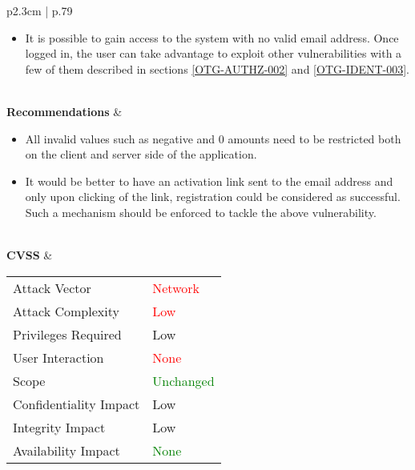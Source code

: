 \begin{longtable}[l]{ p{2.3cm} | p{.79\linewidth} }
\begin{itemize}
            \item It is possible to gain access to the system with no valid email address. Once logged in, the user can take advantage to exploit other vulnerabilities with a few of them described in sections \ref{OTG-AUTHZ-002} and \ref{OTG-IDENT-003}.
        \end{itemize}
    \\
    \textbf{Recommen\-dations} &
        \begin{itemize}
        \item All invalid values such as negative and 0 amounts need to be restricted both on the client and server side of the application.
        \item It would be better to have an activation link sent to the email address and only upon clicking of the link, registration could be considered as successful. Such a mechanism should be enforced to tackle the above vulnerability.
        \end{itemize}
    \\ \hline
    \textbf{CVSS} &
        \begin{tabular}[t]{@{}l | l}
            Attack Vector           & \textcolor{red}{Network} \\
            Attack Complexity       & \textcolor{red}{Low} \\
            Privileges Required     & \textcolor{BurntOrange}{Low} \\
            User Interaction        & \textcolor{red}{None} \\
            Scope                   & \textcolor{Green}{Unchanged} \\
            Confidentiality Impact  & \textcolor{BurntOrange}{Low} \\
            Integrity Impact        & \textcolor{BurntOrange}{Low} \\
            Availability Impact     & \textcolor{Green}{None}
        \end{tabular}
    \\ \hline
\end{longtable}
\clearpage
